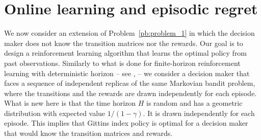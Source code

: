 %
%

\section{Online learning and episodic regret}
\label{sec:problem}

We now consider an extension of Problem~\ref{pb:problem_1} in which the decision maker does not know the transition matrices
nor the rewards. Our goal is to design a reinforcement learning algorithm that
learns the optimal policy from past observations.  Similarly to what is done
for finite-horizon reinforcement learning with deterministic horizon -- see
\eg, \cite{zanette2019tighter,jin2018q,azar2017minimax,osband2013more} --
we consider a decision maker that faces a sequence of independent replicas of
the same Markovian bandit problem, where the transitions and the rewards 
are drawn independently for each episode.
What is new here is that  the time horizon $H$ is random and has a geometric distribution with expected value $1/(1-\gamma)$. It is drawn  independently for each episode. This implies that Gittins index policy is optimal for a decision maker that would know the transition matrices and rewards.

